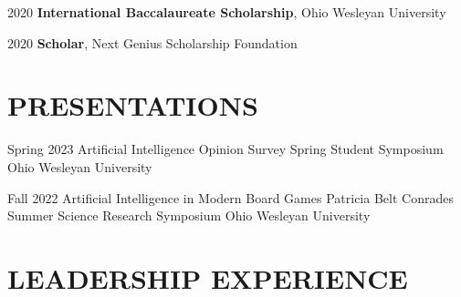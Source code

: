 \documentclass[10pt, letterpaper]{article}
\begin{document}
\begin{honorentry}
  {2020} %
  {\textbf{International Baccalaureate Scholarship}, Ohio Wesleyan University} %
\end{honorentry}

\begin{honorentry}
  {2020} %
  {\textbf{Scholar}, Next Genius Scholarship Foundation} %
\end{honorentry}

\vspace{\headerSpacing}

\section{PRESENTATIONS}

\begin{presentationentry}
  {Spring 2023} %
  {Artificial Intelligence Opinion Survey} %
  {Spring Student Symposium} %
  {Ohio Wesleyan University} %
\end{presentationentry}

\begin{presentationentry}
  {Fall 2022} %
  {Artificial Intelligence in Modern Board Games} %
  {Patricia Belt Conrades Summer Science Research Symposium} %
  {Ohio Wesleyan University} %
\end{presentationentry}

\vspace{\headerSpacing}

\section{LEADERSHIP EXPERIENCE}
\end{document}
